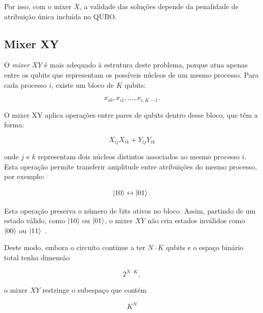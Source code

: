 Por isso, com o mixer $X$, a validade das soluções depende da penalidade de atribuição única incluída no \acs{QUBO}.

\subsection{Mixer XY}
\label{subsec:mixer-xy}

O \textit{mixer} $XY$ é mais adequado à estrutura deste problema, porque atua
apenas entre os qubits que representam os possíveis núcleos de um mesmo processo.
Para cada processo $i$, existe um bloco de $K$ qubits:

\begin{equation}
    x_{i0}, x_{i1}, \dots, x_{i,K-1}.
\end{equation}

O mixer XY aplica operações entre pares de qubits dentro desse bloco, que têm a forma:

\begin{equation}
   X_{ij}X_{ik} + Y_{ij}Y_{ik}
\end{equation}

onde $j$ e $k$ representam dois núcleos distintos associados ao mesmo processo $i$.
Esta operação permite transferir amplitude entre atribuições do mesmo
processo, por exemplo:

\begin{equation}
   \ket{10} \leftrightarrow \ket{01}.
\end{equation}

Esta operação preserva o número de bits ativos no
bloco. Assim, partindo de um estado válido, como $\ket{10}$ ou $\ket{01}$, o mixer
$XY$ não cria estados inválidos como $\ket{00}$ ou $\ket{11}$~\cite{Wang2019XYMixers,Fuchs2022ConstrainedMixers}.

Deste modo, embora o circuito continue a ter $N \cdot K$ qubits e o espaço binário
total tenha dimensão

\begin{equation}
    2^{N \cdot K},
\end{equation}

o mixer $XY$ restringe o subespaço que contém

\begin{equation}
    K^N
\end{equation}

